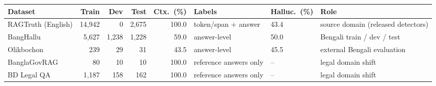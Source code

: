 \begin{tabular}{@{}lrrrrllp{3.1cm}@{}}
\toprule
Dataset & Train & Dev & Test & Ctx.\ (\%) & Labels & Halluc.\ (\%) & Role \\
\midrule
RAGTruth (English) & 14,942 & 0 & 2,675 & 100.0 & token/span + answer & 43.4 & source domain (released detectors) \\
BangHallu & 5,627 & 1,238 & 1,228 & 59.0 & answer-level & 50.0 & Bengali train / dev / test \\
Olikbochon & 239 & 29 & 31 & 43.5 & answer-level & 45.5 & external Bengali evaluation \\
BanglaGovRAG & 80 & 10 & 10 & 100.0 & reference answers only & -- & legal domain shift \\
BD Legal QA & 1,187 & 158 & 162 & 100.0 & reference answers only & -- & legal domain shift \\
\bottomrule
\end{tabular}